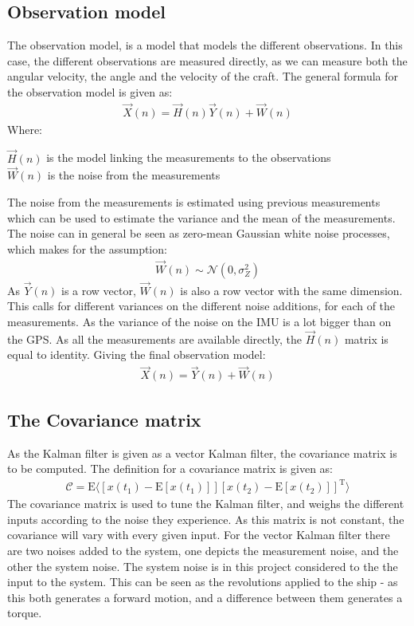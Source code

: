 \subsection{Observation model}
The observation model, is a model that models the different observations. In this case, the different observations are measured directly, as we can measure both the angular velocity, the angle and the velocity of the craft. The general formula for the observation model is given as:
\begin{align}
\vec{X}(n) = \vec{H}(n)\vec{Y}(n) + \vec{W}(n)
\end{align}
\noindent Where:
\begin{ffk}
$\vec{H}(n)$ is the model linking the measurements to the observations\\
$\vec{W}(n)$ is the noise from the measurements
\end{ffk}
The noise from the measurements is estimated using previous measurements which can be used to estimate the variance and the mean of the measurements. The noise can in general be seen as zero-mean Gaussian white noise processes, which makes for the assumption:
\begin{align}
\vec{W}(n) \sim \mathcal{N}(0,\sigma_Z^2)
\end{align}
As $\vec{Y}(n)$ is a row vector, $\vec{W}(n)$ is also a row vector with the same dimension. This calls for different variances on the different noise additions, for each of the measurements. As the variance of the noise on the \ac{IMU} is a lot bigger than on the \ac{GPS}. As all the measurements are available directly, the $\vec{H}(n)$ matrix is equal to identity. Giving the final observation model:
\begin{align}
\vec{X}(n) = \vec{Y}(n) + \vec{W}(n)
\end{align}


\subsection{The Covariance matrix}
As the Kalman filter is given as a vector Kalman filter, the covariance matrix is to be computed. The definition for a covariance matrix is given as:
\begin{align}
\mathcal{C} = \text{E}\langle[x(t_1) - \text{E}[x(t_1)]][x(t_2) - \text{E}[x(t_2)]]^\text{T}\rangle
\end{align}
The covariance matrix is used to tune the Kalman filter, and weighs the different inputs according to the noise they experience. As this matrix is not constant, the covariance will vary with every given input. For the vector Kalman filter there are two noises added to the system, one depicts the measurement noise, and the other the system noise. The system noise is in this project considered to the the input to the system. This can be seen as the revolutions applied to the ship - as this both generates a forward motion, and a difference between them generates a torque. 

